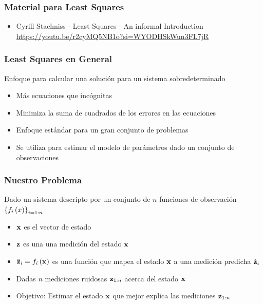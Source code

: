 \begin{frame}
    \frametitle{Material para Least Squares}
    \begin{itemize}
        \item Cyrill Stachniss - Least Squares - An informal Introduction \url{https://youtu.be/r2cyMQ5NB1o?si=WYODHSkWun3FL7jR}
    \end{itemize}
\end{frame}


\begin{frame}
    \frametitle{Least Squares en General}
    
    Enfoque para calcular una solución para un sistema sobredeterminado

    \begin{itemize}
        \item Más ecuaciones que incógnitas
        \item Minimiza la suma de cuadrados de los errores en las ecuaciones
        \item Enfoque estándar para un gran conjunto de problemas
        \item Se utiliza para estimar el modelo de parámetros dado un conjunto de observaciones
    \end{itemize}
\end{frame}

\begin{frame}
    \frametitle{Nuestro Problema}
    
    Dado un sistema descripto por un conjunto de $n$ funciones de observación $\left\{f_{i}\left(x\right)\right\}_{i=1:n}$

    \begin{itemize}
        \item $\boldsymbol{\mathbf{x}}$ es el vector de estado
        \item $\boldsymbol{\mathbf{z}}$ es una una medición del estado $\boldsymbol{\mathbf{x}}$
        \item $\hat{\boldsymbol{\mathbf{z}}}_{i} = f_{i}\left(\boldsymbol{\mathbf{x}}\right)$ es una función que mapea el estado $\boldsymbol{\mathbf{x}}$ a una medición predicha $\hat{\boldsymbol{\mathbf{z}}}_{i}$
        \item Dadas $n$ mediciones ruidosas $\boldsymbol{\mathbf{z}}_{1:n}$ acerca del estado $\boldsymbol{\mathbf{x}}$
        \item Objetivo: Estimar el estado $\boldsymbol{\mathbf{x}}$ que mejor explica las mediciones $\boldsymbol{\mathbf{z}}_{1:n}$
    \end{itemize}
\end{frame}

